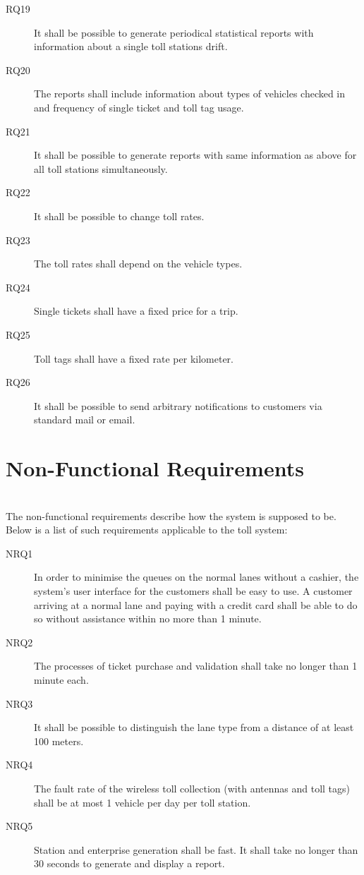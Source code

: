 \begin{description}
  \item[RQ19] It shall be possible to generate periodical statistical reports with information about a single toll stations drift.
  \item[RQ20] The reports shall include information about types of vehicles checked in and frequency of single ticket and toll tag usage.
  \item[RQ21] It shall be possible to generate reports with same information as above for all toll stations simultaneously.

  \item[RQ22] It shall be possible to change toll rates.
  \item[RQ23] The toll rates shall depend on the vehicle types.
  \item[RQ24] Single tickets shall have a fixed price for a trip.
  \item[RQ25] Toll tags shall have a fixed rate per kilometer.
  \item[RQ26] It shall be possible to send arbitrary notifications to customers via standard mail or email.

\end{description}
\section{Non-Functional Requirements} \trevon \pawel \\
The non-functional requirements describe how the system is supposed to be. Below is a list of such requirements applicable to the toll system:

\begin{description}
  \item[NRQ1] In order to minimise the queues on the normal lanes without a cashier, the system's user interface for the customers shall be easy to use. A customer arriving at a normal lane and paying with a credit card shall be able to do so without assistance within no more than 1 minute. 
  \item[NRQ2] The processes of ticket purchase and validation shall take no longer than 1 minute each.
  \item[NRQ3] It shall be possible to distinguish the lane type from a distance of at least 100 meters.
  \item[NRQ4] The fault rate of the wireless toll collection (with antennas and toll tags) shall be at most 1 vehicle per day per toll station.
  \item[NRQ5] Station and enterprise generation shall be fast. It shall take no longer than 30 seconds to generate and display a report.
\end{description}